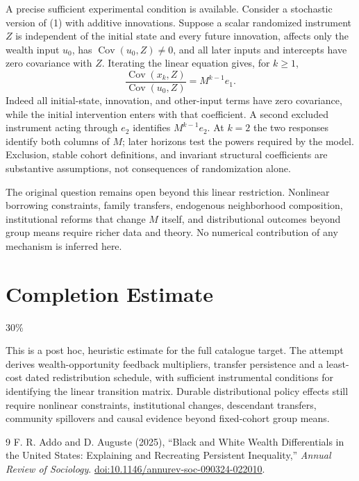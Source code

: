 \documentclass[11pt,a4paper]{article}
\theoremstyle{remark}
\begin{document}
A precise sufficient experimental condition is available. Consider a stochastic version of (1) with additive innovations. Suppose a scalar randomized instrument $Z$ is independent of the initial state and every future innovation, affects only the wealth input $u_0$, has $\operatorname{Cov}(u_0,Z)\ne0$, and all later inputs and intercepts have zero covariance with $Z$. Iterating the linear equation gives, for $k\ge1$,
\[
 \frac{\operatorname{Cov}(x_k,Z)}{\operatorname{Cov}(u_0,Z)}=M^{k-1}e_1. \tag{7}
\]
Indeed all initial-state, innovation, and other-input terms have zero covariance, while the initial intervention enters with that coefficient. A second excluded instrument acting through $e_2$ identifies $M^{k-1}e_2$. At $k=2$ the two responses identify both columns of $M$; later horizons test the powers required by the model. Exclusion, stable cohort definitions, and invariant structural coefficients are substantive assumptions, not consequences of randomization alone.

The original question remains open beyond this linear restriction. Nonlinear borrowing constraints, family transfers, endogenous neighborhood composition, institutional reforms that change $M$ itself, and distributional outcomes beyond group means require richer data and theory. No numerical contribution of any mechanism is inferred here.

\section{Completion Estimate}
30\%

This is a post hoc, heuristic estimate for the full catalogue target.
The attempt derives wealth-opportunity feedback multipliers, transfer persistence and a least-cost dated redistribution schedule, with sufficient instrumental conditions for identifying the linear transition matrix. Durable distributional policy effects still require nonlinear constraints, institutional changes, descendant transfers, community spillovers and causal evidence beyond fixed-cohort group means.

\begin{thebibliography}{9}
 F. R. Addo and D. Auguste (2025), ``Black and White Wealth Differentials in the United States: Explaining and Recreating Persistent Inequality,'' \emph{Annual Review of Sociology}. \href{https://doi.org/10.1146/annurev-soc-090324-022010}{doi:10.1146/annurev-soc-090324-022010}.
\end{thebibliography}
\end{document}
